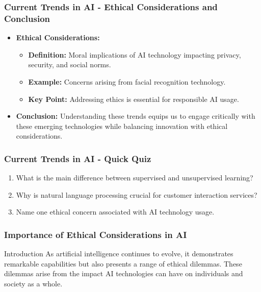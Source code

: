 \documentclass[aspectratio=169]{beamer}
\begin{document}
\begin{frame}[fragile]
    \frametitle{Current Trends in AI - Ethical Considerations and Conclusion}
    \begin{itemize}
        \item \textbf{Ethical Considerations:}
        \begin{itemize}
            \item \textbf{Definition:} Moral implications of AI technology impacting privacy, security, and social norms.
            \item \textbf{Example:} Concerns arising from facial recognition technology.
            \item \textbf{Key Point:} Addressing ethics is essential for responsible AI usage.
        \end{itemize}
        
        \item \textbf{Conclusion:} 
        Understanding these trends equips us to engage critically with these emerging technologies while balancing innovation with ethical considerations.
    \end{itemize}
\end{frame}

\begin{frame}[fragile]
    \frametitle{Current Trends in AI - Quick Quiz}
    \begin{enumerate}
        \item What is the main difference between supervised and unsupervised learning?
        \item Why is natural language processing crucial for customer interaction services?
        \item Name one ethical concern associated with AI technology usage.
    \end{enumerate}
\end{frame}

\begin{frame}[fragile]
    \frametitle{Importance of Ethical Considerations in AI}
    \begin{block}{Introduction}
        As artificial intelligence continues to evolve, it demonstrates remarkable capabilities but also presents a range of ethical dilemmas. These dilemmas arise from the impact AI technologies can have on individuals and society as a whole.
    \end{block}
\end{frame}
\end{document}
